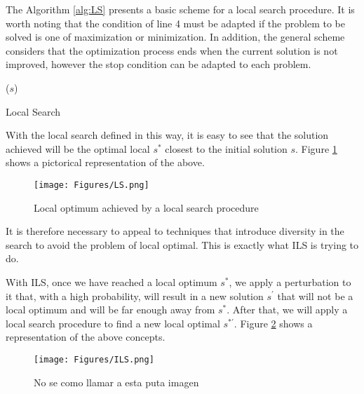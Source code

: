 The Algorithm \ref{alg:LS} presents a basic scheme for a local search procedure. It is worth noting that the condition of line 4 must be adapted if the problem to be solved is one of maximization or minimization. In addition, the general scheme considers that the optimization process ends when the current solution is not improved, however the stop condition can be adapted to each problem.

\begin{algorithm}
	\SetNlSkip{0.5em}
	\BlankLine
	\BlankLine
	\KwRet ($s$)
	
	\caption{Local Search}\label{alg:LS}
\end{algorithm}

With the local search defined in this way, it is easy to see that the solution achieved will be the optimal local $s^*$ closest to the initial solution $s$. Figure \ref{img:LS} shows a pictorical representation of the above.

\begin{figure}[!h]
	\centering
	\texttt{[image: Figures/LS.png]}
	\caption{Local optimum achieved by a local search procedure}\label{img:LS}
\end{figure}

It is therefore necessary to appeal to techniques that introduce diversity in the search to avoid the problem of local optimal. This is exactly what ILS is trying to do.

With ILS, once we have reached a local optimum $s^*$, we apply a perturbation to it that, with a high probability, will result in a new solution $s^\prime$ that will not be a local optimum and will be far enough away from $s^*$. After that, we will apply a local search procedure to find a new local optimal $s^{*\prime}$. Figure \ref{img:ILS} shows a representation of the above concepts.

\begin{figure}[!h]
	\centering
	\texttt{[image: Figures/ILS.png]}
	\caption{No se como llamar a esta puta imagen}\label{img:ILS}
\end{figure}

